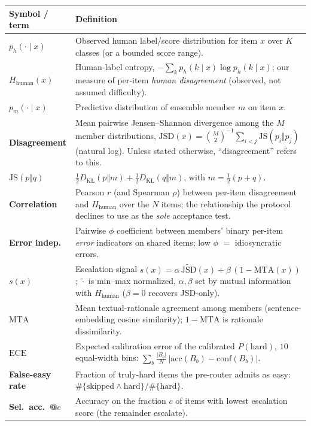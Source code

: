 \documentclass[letterpaper]{article} %
\begin{document}
\begin{table}[t]
\centering
\small
\begin{tabular}{lp{}}
\toprule
\textbf{Symbol / term} & \textbf{Definition} \\
\midrule
$p_h(\cdot\mid x)$ & Observed human label/score distribution for item $x$ over $K$ classes (or a bounded score range). \\
$H_{\text{human}}(x)$ & Human-label entropy, $-\sum_k p_h(k\mid x)\log p_h(k\mid x)$; our measure of per-item \emph{human disagreement} (observed, not assumed difficulty). \\
$p_m(\cdot\mid x)$ & Predictive distribution of ensemble member $m$ on item $x$. \\
\textbf{Disagreement} & Mean pairwise Jensen--Shannon divergence among the $M$ member distributions, $\mathrm{JSD}(x)=\binom{M}{2}^{-1}\sum_{i<j}\mathrm{JS}(p_i\Vert p_j)$ (natural log). Unless stated otherwise, ``disagreement'' refers to this. \\
$\mathrm{JS}(p\Vert q)$ & $\tfrac12 D_{\mathrm{KL}}(p\Vert m)+\tfrac12 D_{\mathrm{KL}}(q\Vert m)$, with $m=\tfrac12(p+q)$. \\
\textbf{Correlation} & Pearson $r$ (and Spearman $\rho$) between per-item disagreement and $H_{\text{human}}$ over the $N$ items; the relationship the protocol declines to use as the \emph{sole} acceptance test. \\
\textbf{Error indep.} & Pairwise $\phi$ coefficient between members' binary per-item \emph{error} indicators on shared items; low $\phi$ $=$ idiosyncratic errors. \\
$s(x)$ & Escalation signal $s(x)=\alpha\,\widetilde{\mathrm{JSD}}(x)+\beta\,(1{-}\mathrm{MTA}(x))$; $\widetilde{\cdot}$ is min--max normalized, $\alpha,\beta$ set by mutual information with $H_{\text{human}}$ ($\beta{=}0$ recovers JSD-only). \\
$\mathrm{MTA}$ & Mean textual-rationale agreement among members (sentence-embedding cosine similarity); $1{-}\mathrm{MTA}$ is rationale dissimilarity. \\
$\mathrm{ECE}$ & Expected calibration error of the calibrated $P(\text{hard})$, $10$ equal-width bins: $\sum_b \tfrac{|B_b|}{N}\,|\mathrm{acc}(B_b)-\mathrm{conf}(B_b)|$. \\
\textbf{False-easy rate} & Fraction of truly-hard items the pre-router admits as easy: $\#\{\text{skipped}\wedge\text{hard}\}/\#\{\text{hard}\}$. \\
\textbf{Sel.\ acc.\ @$c$} & Accuracy on the fraction $c$ of items with lowest escalation score (the remainder escalate). \\

\end{tabular}
\end{table}
\end{document}
